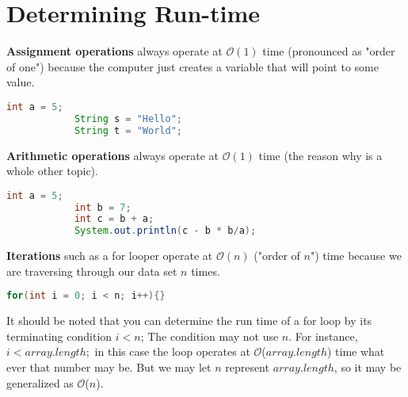 \documentclass{article}
\newcommand{\bigO}{\mathcal{O}}
\begin{document}
    \section{Determining Run-time}
        \textbf{Assignment operations} always operate at $\bigO(1)$ time (pronounced as "order of one") because the computer just creates a variable that will point to some value.\newline
        \begin{lstlisting}[language=Java]
            int a = 5;
            String s = "Hello";
            String t = "World";
        \end{lstlisting}
        \textbf{Arithmetic operations} always operate at $\bigO(1)$ time (the reason why is a whole other topic).
        \begin{lstlisting}[language=Java]
            int a = 5;
            int b = 7;
            int c = b + a;
            System.out.println(c - b * b/a);
        \end{lstlisting}
        \textbf{Iterations} such as a for looper operate at $\bigO(n)$ ("order of $n$") time because we are traversing through our data set $n$ times.
        \begin{lstlisting}[language=Java]
            for(int i = 0; i < n; i++){}
        \end{lstlisting}
        It should be noted that you can determine the run time of a for loop by its terminating condition $i < n$; The condition may not use $n$. For instance, $i < array.length;$ in this case the loop operates at $\bigO$($array.length$) time what ever that number may be. But we may let $n$ represent $array.length$, so it may be generalized as $\bigO$($n$).
\end{document}
